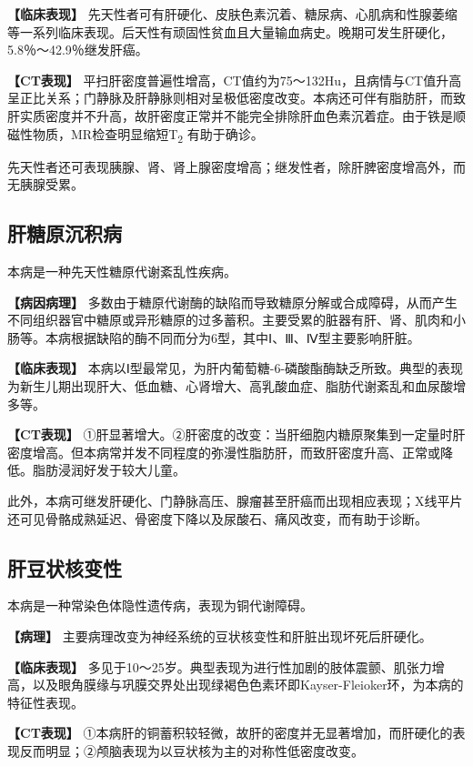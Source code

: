 \textbf{【临床表现】}
先天性者可有肝硬化、皮肤色素沉着、糖尿病、心肌病和性腺萎缩等一系列临床表现。后天性有顽固性贫血且大量输血病史。晚期可发生肝硬化，5.8％～42.9％继发肝癌。

\textbf{【CT表现】}
平扫肝密度普遍性增高，CT值约为75～132Hu，且病情与CT值升高呈正比关系；门静脉及肝静脉则相对呈极低密度改变。本病还可伴有脂肪肝，而致肝实质密度并不升高，故肝密度正常并不能完全排除肝血色素沉着症。由于铁是顺磁性物质，MR检查明显缩短T\textsubscript{2}
有助于确诊。

先天性者还可表现胰腺、肾、肾上腺密度增高；继发性者，除肝脾密度增高外，而无胰腺受累。

\subsection{肝糖原沉积病}

本病是一种先天性糖原代谢紊乱性疾病。

\textbf{【病因病理】}
多数由于糖原代谢酶的缺陷而导致糖原分解或合成障碍，从而产生不同组织器官中糖原或异形糖原的过多蓄积。主要受累的脏器有肝、肾、肌肉和小肠等。本病根据缺陷的酶不同而分为6型，其中Ⅰ、Ⅲ、Ⅳ型主要影响肝脏。

\textbf{【临床表现】}
本病以Ⅰ型最常见，为肝内葡萄糖-6-磷酸酯酶缺乏所致。典型的表现为新生儿期出现肝大、低血糖、心肾增大、高乳酸血症、脂肪代谢紊乱和血尿酸增多等。

\textbf{【CT表现】}
①肝显著增大。②肝密度的改变：当肝细胞内糖原聚集到一定量时肝密度增高。但本病常并发不同程度的弥漫性脂肪肝，而致肝密度升高、正常或降低。脂肪浸润好发于较大儿童。

此外，本病可继发肝硬化、门静脉高压、腺瘤甚至肝癌而出现相应表现；X线平片还可见骨骼成熟延迟、骨密度下降以及尿酸石、痛风改变，而有助于诊断。

\subsection{肝豆状核变性}

本病是一种常染色体隐性遗传病，表现为铜代谢障碍。

\textbf{【病理】}
主要病理改变为神经系统的豆状核变性和肝脏出现坏死后肝硬化。

\textbf{【临床表现】}
多见于10～25岁。典型表现为进行性加剧的肢体震颤、肌张力增高，以及眼角膜缘与巩膜交界处出现绿褐色色素环即Kayser-Fleioker环，为本病的特征性表现。

\textbf{【CT表现】}
①本病肝的铜蓄积较轻微，故肝的密度并无显著增加，而肝硬化的表现反而明显；②颅脑表现为以豆状核为主的对称性低密度改变。

